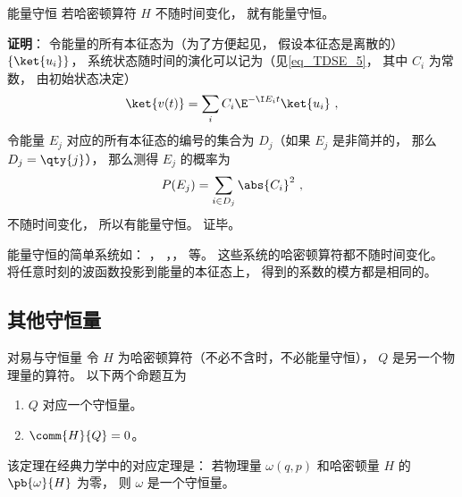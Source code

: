 \begin{theorem}{能量守恒}
若哈密顿算符 $H$ 不随时间变化， 就有能量守恒。
\end{theorem}
\textbf{证明}： 令能量的所有本征态为（为了方便起见， 假设本征态是离散的） $\{\ket{u_i}\}$， 系统状态随时间的演化可以记为（见\autoref{eq_TDSE_5}， 其中 $C_i$ 为常数， 由初始状态决定）
\begin{equation}
\ket{v(t)} = \sum_i C_i \E^{-\I E_i t} \ket{u_i}~,
\end{equation}
令能量 $E_j$ 对应的所有本征态的编号的集合为 $D_j$（如果 $E_j$ 是非简并的， 那么 $D_j = \qty{j}$），%
那么测得 $E_j$ 的概率为
\begin{equation}
P(E_j) = \sum_{i \in D_j} \abs{C_i}^2~,
\end{equation}
不随时间变化， 所以有能量守恒。 证毕。

\begin{example}{}
能量守恒的简单系统如： ， ，， 等。 这些系统的哈密顿算符都不随时间变化。 将任意时刻的波函数投影到能量的本征态上， 得到的系数的模方都是相同的。
\end{example}

\subsection{其他守恒量}


\begin{theorem}{对易与守恒量}
令 $H$ 为哈密顿算符（不必不含时，不必能量守恒）， $Q$ 是另一个物理量的算符。 以下两个命题互为
\begin{enumerate}
\item $Q$ 对应一个守恒量。
\item $\comm{H}{Q} = 0$。
\end{enumerate}
\end{theorem}

该定理在经典力学中的对应定理是： 若物理量 $\omega(q, p)$ 和哈密顿量 $H$ 的 $\pb{\omega}{H}$ 为零， 则 $\omega$ 是一个守恒量。

